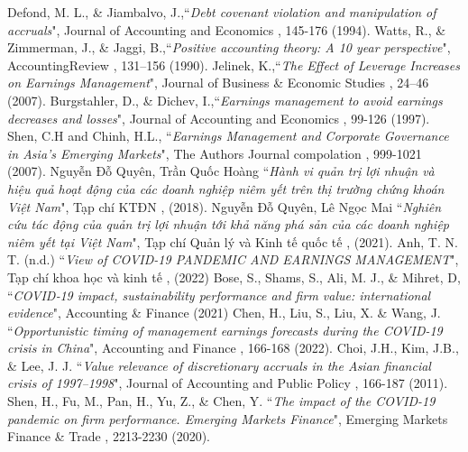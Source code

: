 \documentclass[a4paper]{article}
\begin{document}
\begin{thebibliography}{99}
 Defond, M. L., \& Jiambalvo, J.,``\emph{Debt covenant violation and manipulation of accruals}", Journal of Accounting and Economics , 145-176 (1994).
 Watts, R., \& Zimmerman, J., \& Jaggi, B.,``\emph{Positive accounting theory: A 10 year perspective}", AccountingReview , 131–156 (1990).
 Jelinek, K.,``\emph{The Effect of Leverage Increases on Earnings Management}", Journal of Business \& Economic Studies , 24–46 (2007).
 Burgstahler, D., \&  Dichev, I.,``\emph{Earnings management to avoid earnings decreases and losses}", Journal of Accounting and Economics , 99-126 (1997).
 Shen, C.H and Chinh, H.L., ``\emph{Earnings Management and Corporate Governance in Asia's Emerging Markets}", The Authors Journal compolation , 999-1021 (2007).
 Nguyễn Đỗ Quyên, Trần Quốc Hoàng ``\emph{Hành vi quản trị lợi nhuận và hiệu quả hoạt động của các doanh nghiệp niêm yết trên thị trường chứng khoán Việt Nam}", Tạp chí KTĐN , (2018).
 Nguyễn Đỗ Quyên, Lê Ngọc Mai ``\emph{Nghiên cứu tác động của quản trị lợi nhuận tới khả năng phá sản của các doanh nghiệp niêm yết tại Việt Nam}", Tạp chí Quản lý và Kinh tế quốc tế , (2021).
 Anh, T. N. T. (n.d.) ``\emph{View of COVID-19 PANDEMIC AND EARNINGS MANAGEMENT}", Tạp chí khoa học và kinh tế , (2022)
 Bose, S., Shams, S., Ali, M. J., \& Mihret, D, ``\emph{COVID‐19 impact, sustainability performance and firm value: international evidence}", Accounting \& Finance (2021)
 Chen, H., Liu, S., Liu, X. \& Wang, J. ``\emph{Opportunistic timing of management earnings forecasts during the COVID-19 crisis in China}", Accounting and Finance , 166-168 (2022).
 Choi, J.H., Kim, J.B., \& Lee, J. J. ``\emph{Value relevance of discretionary accruals in the Asian financial crisis of 1997–1998}", Journal of Accounting and Public Policy , 166-187 (2011).
 Shen, H., Fu, M., Pan, H., Yu, Z., \& Chen, Y. ``\emph{The impact of the COVID-19 pandemic on firm performance. Emerging Markets Finance}", Emerging Markets Finance \& Trade , 2213-2230 (2020).

\end{thebibliography}
\end{document}
